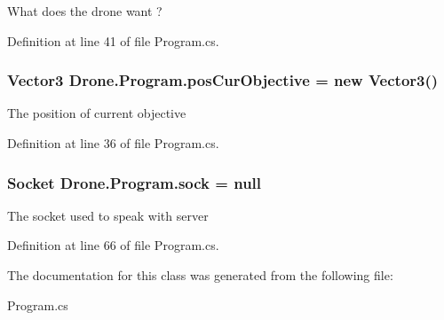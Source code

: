 What does the drone want ? 



Definition at line 41 of file Program.\+cs.

\hypertarget{class_drone_1_1_program_a14665ed89a4807be1919bf2cb7d1e943}{}
\subsubsection[{pos\+Cur\+Objective}]{\setlength{\rightskip}{0pt plus 5cm}Vector3 Drone.\+Program.\+pos\+Cur\+Objective = new Vector3()\hspace{0.3cm}{\ttfamily [static]}}\label{class_drone_1_1_program_a14665ed89a4807be1919bf2cb7d1e943}


The position of current objective 



Definition at line 36 of file Program.\+cs.

\hypertarget{class_drone_1_1_program_a1d4d7b0f7bafc2486e62c2f76999e1ab}{}
\subsubsection[{sock}]{\setlength{\rightskip}{0pt plus 5cm}Socket Drone.\+Program.\+sock = null\hspace{0.3cm}{\ttfamily [static]}}\label{class_drone_1_1_program_a1d4d7b0f7bafc2486e62c2f76999e1ab}


The socket used to speak with server 



Definition at line 66 of file Program.\+cs.



The documentation for this class was generated from the following file\+:\begin{DoxyCompactItemize}
\item 
Program.\+cs\end{DoxyCompactItemize}
